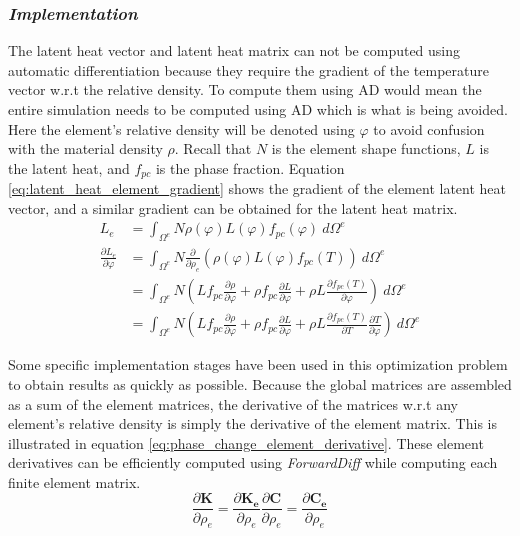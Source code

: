 \subsubsection*{\emph{Implementation}}
The latent heat vector and latent heat matrix can not be computed using automatic differentiation because they require the gradient of the temperature vector w.r.t the relative density. To compute them using AD would mean the entire simulation needs to be computed using AD which is what is being avoided. Here the element's relative density will be denoted using $\varphi$ to avoid confusion with the material density $\rho$. Recall that $N$ is the element shape functions, $L$ is the latent heat, and $f_{pc}$ is the phase fraction. Equation \ref{eq:latent_heat_element_gradient} shows the gradient of the element latent heat vector, and a similar gradient can be obtained for the latent heat matrix.
\begin{equation}
  \begin{split}
    L_e &= \int_{\Omega^e} N \rho(\varphi) L(\varphi)f_{pc}(\varphi)\ d\Omega^e \\
    \frac{\partial L_e}{\partial\varphi} &= \int_{\Omega^e} N \frac{\partial}{\partial\rho_e}\left(\rho(\varphi) L(\varphi)f_{pc}(T)\right)\ d\Omega^e \\
    &= \int_{\Omega^e} N \left( Lf_{pc}\frac{\partial\rho}{\partial\varphi} + \rho f_{pc}\frac{\partial L}{\partial\varphi} + \rho L\frac{\partial f_{pc}(T)}{\partial\varphi} \right) \ d\Omega^e \\
    &= \int_{\Omega^e} N \left( Lf_{pc}\frac{\partial\rho}{\partial\varphi} + \rho f_{pc}\frac{\partial L}{\partial\varphi} + \rho L\frac{\partial f_{pc}(T)}{\partial T}\frac{\partial T}{\partial\varphi} \right) \ d\Omega^e
  \end{split}
  \label{eq:latent_heat_element_gradient}
\end{equation}

Some specific implementation stages have been used in this optimization problem to obtain results as quickly as possible. Because the global matrices are assembled as a sum of the element matrices, the derivative of the matrices w.r.t any element's relative density is simply the derivative of the element matrix. This is illustrated in equation \ref{eq:phase_change_element_derivative}. These element derivatives can be efficiently computed using \emph{ForwardDiff} while computing each finite element matrix.
\begin{subequations}
  \begin{equation}
    \frac{\partial\mathbf{K}}{\partial\rho_e} = \frac{\partial\mathbf{K_e}}{\partial\rho_e}
  \end{equation}
  \begin{equation}
    \frac{\partial\mathbf{C}}{\partial\rho_e} = \frac{\partial\mathbf{C_e}}{\partial\rho_e}
  \end{equation}
  \label{eq:phase_change_element_derivative}
\end{subequations}

